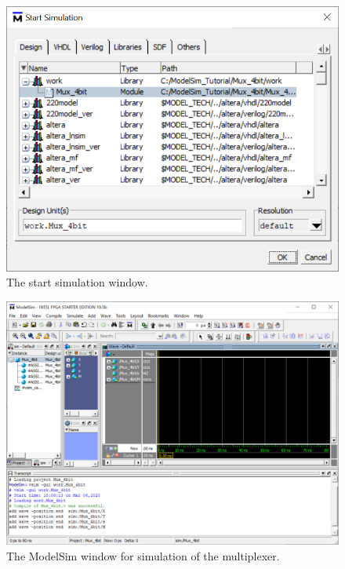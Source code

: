 \documentclass[11pt, twoside, pdftex]{article}
\begin{document}
\begin{figure}[H]
   \begin{center}
      \includegraphics[scale=0.70]{figures/mux_start_sim.png}
   \caption{The start simulation window.} 
	 \label{fig:mux_start_sim}
	 \end{center}
\end{figure}

\begin{figure}[H]
   \begin{center}
      \includegraphics[width=.95\textwidth]{figures/mux_main.png}
   \caption{The ModelSim window for simulation of the multiplexer.} 
	 \label{fig:mux_main}
	 \end{center}
\end{figure}
\end{document}
